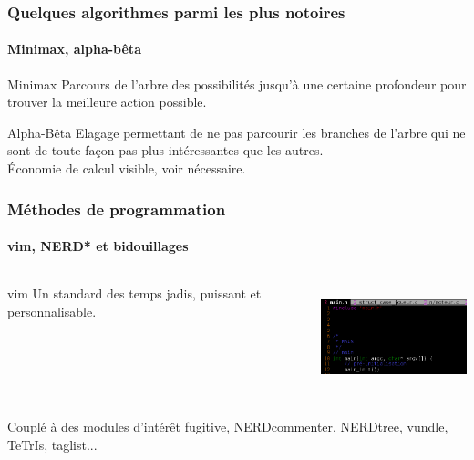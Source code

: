 \documentclass{beamer}
\begin{document}
    \begin{frame}
    \frametitle{Quelques algorithmes parmi les plus notoires}
    \framesubtitle{Minimax, alpha-bêta}
        \begin{block}{Minimax}
            Parcours de l'arbre des possibilités jusqu'à une certaine profondeur pour trouver la meilleure action possible.
        \end{block}
        \begin{block}{Alpha-Bêta}
            Elagage permettant de ne pas parcourir les branches de l'arbre qui ne sont de toute façon pas plus intéressantes que les autres.\\
            Économie de calcul visible, voir nécessaire.
        \end{block}
    \end{frame}


    \begin{frame}
    \frametitle{Méthodes de programmation}
    \framesubtitle{vim, NERD* et bidouillages}
        \begin{columns}[c] %
            \begin{column}{5cm} %
                \begin{block}{vim}
                    Un standard des temps jadis, puissant et personnalisable.
                \end{block}
            \end{column}
            \begin{column}{5cm} %
                \includegraphics[width=5cm, height=3cm]{ressources/presentation/vim.png}
            \end{column}
        \end{columns}
        \begin{exampleblock}{Couplé à des modules d'intérêt}
            fugitive, NERDcommenter, NERDtree, vundle, TeTrIs, taglist... 
        \end{exampleblock}
    \end{frame}
\end{document}

